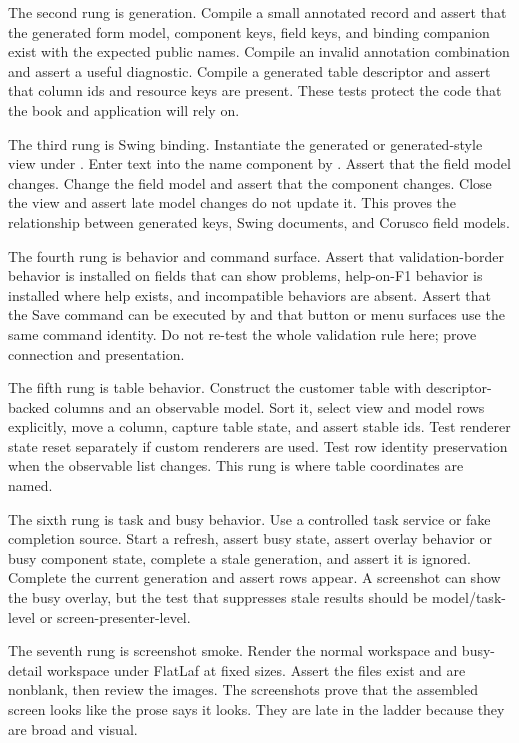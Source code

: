 The second rung is generation. Compile a small annotated  record and assert that the generated form model, component keys, field keys, and binding companion exist with the expected public names. Compile an invalid annotation combination and assert a useful diagnostic. Compile a generated table descriptor and assert that column ids and resource keys are present. These tests protect the code that the book and application will rely on.

The third rung is Swing binding. Instantiate the generated or generated-style view under . Enter text into the name component by . Assert that the field model changes. Change the field model and assert that the component changes. Close the view and assert late model changes do not update it. This proves the relationship between generated keys, Swing documents, and Corusco field models.

The fourth rung is behavior and command surface. Assert that validation-border behavior is installed on fields that can show problems, help-on-F1 behavior is installed where help exists, and incompatible behaviors are absent. Assert that the Save command can be executed by  and that button or menu surfaces use the same command identity. Do not re-test the whole validation rule here; prove connection and presentation.

The fifth rung is table behavior. Construct the customer table with descriptor-backed columns and an observable model. Sort it, select view and model rows explicitly, move a column, capture table state, and assert stable ids. Test renderer state reset separately if custom renderers are used. Test row identity preservation when the observable list changes. This rung is where table coordinates are named.

The sixth rung is task and busy behavior. Use a controlled task service or fake completion source. Start a refresh, assert busy state, assert overlay behavior or busy component state, complete a stale generation, and assert it is ignored. Complete the current generation and assert rows appear. A screenshot can show the busy overlay, but the test that suppresses stale results should be model/task-level or screen-presenter-level.

The seventh rung is screenshot smoke. Render the normal workspace and busy-detail workspace under FlatLaf at fixed sizes. Assert the files exist and are nonblank, then review the images. The screenshots prove that the assembled screen looks like the prose says it looks. They are late in the ladder because they are broad and visual.

